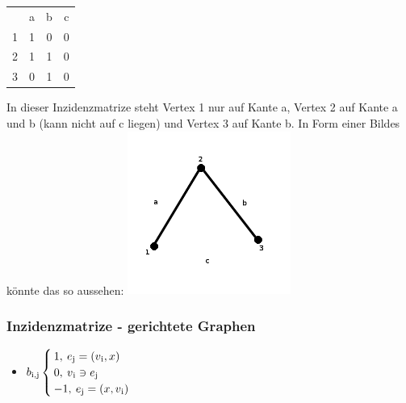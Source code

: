 \begin{tabular}{cccc}
 & a & b & c \\
1 & 1 & 0 & 0 \\
2 & 1 & 1 & 0 \\
3 & 0 & 1 & 0 \\
\end{tabular}
\newline\newline
In dieser Inzidenzmatrize steht Vertex 1 nur auf Kante a, Vertex 2 auf Kante a und b (kann nicht auf c liegen) und Vertex 3 auf Kante b. In Form einer Bildes könnte das so aussehen:\newline
\includegraphics[width=0.4\textwidth]{lectures/161028/pix/dreieck.png}


\subsubsection{Inzidenzmatrize - gerichtete Graphen}
\begin{itemize}
	\item $b\textsubscript{i,j}\begin{cases}1,\>e\textsubscript{j}=(v\textsubscript{i},x)\\0,\>v\textsubscript{i}\ni e\textsubscript{j}\\-1,\>e\textsubscript{j}=(x,v\textsubscript{i})\end{cases}$\newline
\end{itemize}

